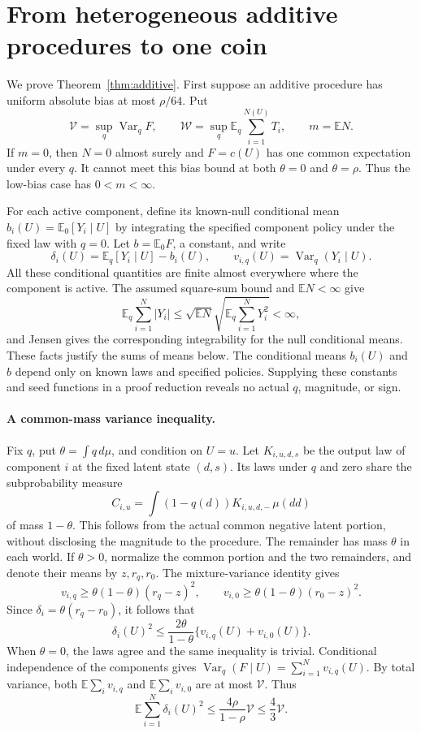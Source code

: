 \documentclass[11pt]{article}
\newcommand{\E}{\mathbb E}
\newcommand{\Var}{\operatorname{Var}}
\begin{document}
\section{From heterogeneous additive procedures to one coin}
We prove Theorem~\ref{thm:additive}. First suppose an additive procedure has
uniform absolute bias at most $\rho/64$. Put
\[
 \mathcal V=\sup_q\Var_q F,
 \qquad \mathcal W=\sup_q\E_q\sum_{i=1}^{N(U)}T_i,
 \qquad m=\E N.
\]
If $m=0$, then $N=0$ almost surely and $F=c(U)$ has one common expectation
under every $q$. It cannot meet this bias bound at both $\theta=0$ and
$\theta=\rho$. Thus the low-bias case has $0<m<\infty$.

For each active component, define its known-null conditional mean
$b_i(U)=\E_0[Y_i\mid U]$ by integrating the specified component policy under
the fixed law with $q=0$. Let $b=\E_0F$, a constant, and write
\[
 \delta_i(U)=\E_q[Y_i\mid U]-b_i(U),\qquad
 v_{i,q}(U)=\Var_q(Y_i\mid U).
\]
All these conditional quantities are finite almost everywhere where the
component is active. The assumed square-sum bound and $\E N<\infty$ give
\[
 \E_q\sum_{i=1}^N|Y_i|
 \le\sqrt{\E N}\sqrt{\E_q\sum_{i=1}^NY_i^2}<\infty,
\]
and Jensen gives the corresponding integrability for the null conditional
means. These facts justify the sums of means below. The conditional means
$b_i(U)$ and $b$ depend only on known laws and specified policies. Supplying
these constants and seed functions in a proof reduction reveals no actual
$q$, magnitude, or sign.

\paragraph{A common-mass variance inequality.}
Fix $q$, put $\theta=\int q\,d\mu$, and condition on $U=u$.
Let $K_{i,u,d,s}$ be the output law of component $i$ at the fixed latent state
$(d,s)$. Its laws under $q$ and zero share the subprobability measure
\[
 C_{i,u}=\int(1-q(d))K_{i,u,d,-}\,\mu(dd)
\]
of mass $1-\theta$. This follows from the actual common negative latent
portion, without disclosing the magnitude to the procedure. The remainder
has mass $\theta$ in each world. If $\theta>0$, normalize the common portion
and the two remainders, and denote their means by $z,r_q,r_0$.
The mixture-variance identity gives
\[
 v_{i,q}\ge\theta(1-\theta)(r_q-z)^2,
 \qquad v_{i,0}\ge\theta(1-\theta)(r_0-z)^2.
\]
Since $\delta_i=\theta(r_q-r_0)$, it follows that
\[
 \delta_i(U)^2
 \le\frac{2\theta}{1-\theta}
          \{v_{i,q}(U)+v_{i,0}(U)\}.                    \tag{18}
\]
When $\theta=0$, the laws agree and the same inequality is trivial.
Conditional independence of the components gives
$\Var_q(F\mid U)=\sum_{i=1}^Nv_{i,q}(U)$.
By total variance, both $\E\sum_i v_{i,q}$ and $\E\sum_i v_{i,0}$ are at
most $\mathcal V$. Thus
\[
 \E\sum_{i=1}^N\delta_i(U)^2
 \le\frac{4\rho}{1-\rho}\mathcal V
 \le\frac43\mathcal V.                                 \tag{19}
\]
\end{document}
